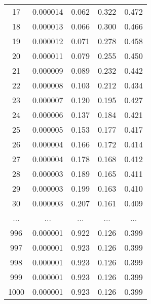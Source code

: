 \documentclass[a4paper,12pt]{article} %
\begin{document}
\begin{table}[ht]
\begin{tabular}{|c|c|c|c|c|}
            17 & 0.000014 & 0.062 & 0.322 & 0.472 \\
            18 & 0.000013 & 0.066 & 0.300 & 0.466 \\
            19 & 0.000012 & 0.071 & 0.278 & 0.458 \\
            20 & 0.000011 & 0.079 & 0.255 & 0.450 \\
            21 & 0.000009 & 0.089 & 0.232 & 0.442 \\
            22 & 0.000008 & 0.103 & 0.212 & 0.434 \\
            23 & 0.000007 & 0.120 & 0.195 & 0.427 \\
            24 & 0.000006 & 0.137 & 0.184 & 0.421 \\
            25 & 0.000005 & 0.153 & 0.177 & 0.417 \\
            26 & 0.000004 & 0.166 & 0.172 & 0.414 \\
            27 & 0.000004 & 0.178 & 0.168 & 0.412 \\
            28 & 0.000003 & 0.189 & 0.165 & 0.411 \\
            29 & 0.000003 & 0.199 & 0.163 & 0.410 \\
            30 & 0.000003 & 0.207 & 0.161 & 0.409 \\
            ... & ... & ... & ... & ... \\
            996 & 0.000001 & 0.922 & 0.126 & 0.399 \\
997 & 0.000001 & 0.923 & 0.126 & 0.399 \\
998 & 0.000001 & 0.923 & 0.126 & 0.399 \\
999 & 0.000001 & 0.923 & 0.126 & 0.399 \\
1000 & 0.000001 & 0.923 & 0.126 & 0.399 \\
            \hline
    \end{tabular}
    \end{table}
\end{document}
